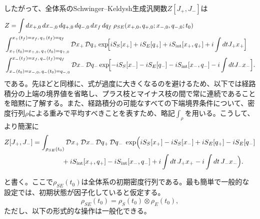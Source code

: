 \documentclass[a4paper,11pt,oneside]{article}
\theoremstyle{definition}
\numberwithin{equation}{section}
\begin{document}
したがって、全体系のSchwinger--Keldysh生成汎関数$  Z[J_+,J_-] $は
\begin{align}
&Z=\int dx_{+,0}\,dx_{-,0}\,dq_{+,0}\,dq_{-,0}\,dx_f\,dq_f\;
\rho_{SE}(x_{+,0},q_{+,0};x_{-,0},q_{-,0};t_0)
\nonumber\\
& \int_{x_+(t_0)=x_{+,0},\,q_+(t_0)=q_{+,0}}^{x_+(t_f)=x_f,\,q_+(t_f)=q_f}
\mathcal D x_+\,\mathcal D q_+ 
\exp\!\Bigl[
iS_S[x_+] + iS_E[q_+] + iS_{\rm int}[x_+,q_+]
+ i\int dt J_+x_+
\Bigr]
\nonumber\\
&  \int_{x_-(t_0)=x_{-,0},\,q_-(t_0)=q_{-,0}}^{x_-(t_f)=x_f,\,q_-(t_f)=q_f}
\mathcal D x_-\,\mathcal D q_- 
\exp\!\Bigl[
-iS_S[x_-] - iS_E[q_-] - iS_{\rm int}[x_-,q_-]
- i\int dt J_-x_-
\Bigr] .\nonumber
\end{align}
である。先ほどと同様に、式が過度に大きくなるのを避けるため、以下では経路積分の上端の境界値を省略し、プラス枝とマイナス枝の間で常に連続であることを暗黙に了解する。また、経路積分の可能なすべての下端境界条件について、密度行列$ \rho$による重みで平均すべきことを表すため、略記$ \int_{\rho}$を用いる。こうして、より簡潔に
\begin{align}
Z[J_+,J_-]
&=
\int_{\rho_{SE}(t_0)} \mathcal D x_+\,\mathcal D x_-\,\mathcal D q_+\,\mathcal D q_-\;
\exp\Bigl(
iS_S[x_+] - iS_S[x_-]
+iS_E[q_+] - iS_E[q_-]
\nonumber\\
&\hspace{1.5cm}
+iS_{\rm int}[x_+,q_+] - iS_{\rm int}[x_-,q_-]
+i\int dt\,J_+ x_+ - i\int dt\,J_- x_-
\Bigr) .
\end{align}


と書く。ここで\(\rho_{SE}(t_0)\)は全体系の初期密度行列である。最も簡単で一般的な設定では、初期状態が因子化していると仮定する。
\begin{equation}\label{factorisedrho}
\rho_{SE}(t_0)=\rho_S(t_0)\otimes \rho_E(t_0) ,
\end{equation}
ただし、以下の形式的な操作は一般化できる。
\end{document}
